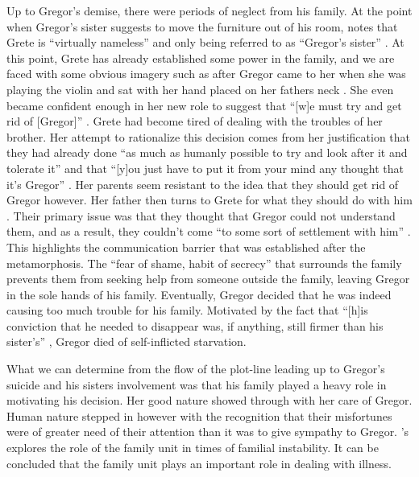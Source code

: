 \documentclass{article}
\begin{document}

Up to Gregor's demise, there were periods of neglect from his family. At the
point when Gregor's sister suggests to move the furniture out of his room,
\citeauthor{cantrellFamily} notes that Grete is ``virtually nameless'' and
only being referred to as ``Gregor's sister'' \cite[584,
584]{cantrellFamily}. At this point, Grete has already established some
power in the family, and we are faced with some obvious imagery such as
after Gregor came to her when she was playing the violin and sat with her
hand placed on her fathers neck \cite[140]{kafka2007meta}. She even became
confident enough in her new role to suggest that ``[w]e must try and get rid
of [Gregor]'' \cite[138]{kafka2007meta}. Grete had become tired of dealing
with the troubles of her brother. Her attempt to rationalize this decision
comes from her justification that they had already done ``as much as humanly
possible to try and look after it and tolerate it'' and that ``[y]ou just
have to put it from your mind any thought that it's Gregor'' \cite[138,
139]{kafka2007meta}. Her parents seem resistant to the idea that they should
get rid of Gregor however. Her father then turns to Grete for what they
should do with him \cite[139]{kafka2007meta}. Their primary issue was that
they thought that Gregor could not understand them, and as a result, they
couldn't come ``to some sort of settlement with him''
\cite[139]{kafka2007meta}. This highlights the communication barrier that
was established after the metamorphosis. The ``fear of shame, habit of
secrecy'' \cite[585]{cantrellFamily} that surrounds the family prevents them
from seeking help from someone outside the family, leaving Gregor in the
sole hands of his family. Eventually, Gregor decided that he was indeed
causing too much trouble for his family. Motivated by the fact that ``[h]is
conviction that he needed to disappear was, if anything, still firmer than
his sister's'' \cite[141]{kafka2007meta}, Gregor died of self-inflicted
starvation.


What we can determine from the flow of the plot-line leading up to Gregor's
suicide and his sisters involvement was that his family played a heavy role
in motivating his decision. Her good nature showed through with her care of
Gregor. Human nature stepped in however with the recognition that their
misfortunes were of greater need of their attention than it was to give
sympathy to Gregor. \citeauthor{kafka2007meta}'s 
explores the role of the family unit in times of familial instability. It
can be concluded that the family unit plays an important role in dealing
with illness.

\makeworkscited
\end{document}
